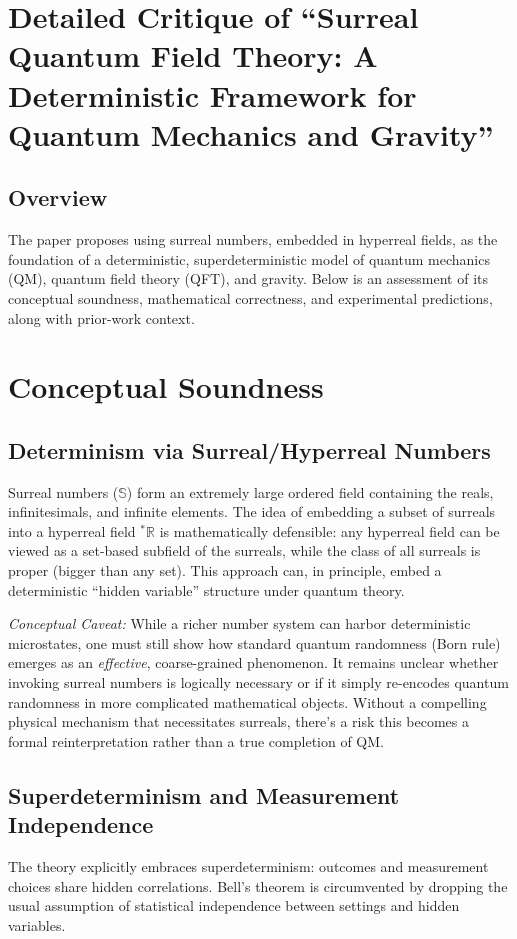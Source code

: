 \documentclass[11pt]{article}
\begin{document}
\section*{Detailed Critique of ``Surreal Quantum Field Theory: A Deterministic Framework for Quantum Mechanics and Gravity''}

\subsection*{Overview}
The paper proposes using surreal numbers, embedded in hyperreal fields, as the foundation of a deterministic, superdeterministic model of quantum mechanics (QM), quantum field theory (QFT), and gravity. Below is an assessment of its conceptual soundness, mathematical correctness, and experimental predictions, along with prior-work context.

\section{Conceptual Soundness}

\subsection{Determinism via Surreal/Hyperreal Numbers}
Surreal numbers ($\mathbb{S}$) form an extremely large ordered field containing the reals, infinitesimals, and infinite elements. The idea of embedding a subset of surreals into a hyperreal field ${}^*\mathbb{R}$ is mathematically defensible: any hyperreal field can be viewed as a set-based subfield of the surreals, while the class of all surreals is proper (bigger than any set). This approach can, in principle, embed a deterministic ``hidden variable'' structure under quantum theory. 

\emph{Conceptual Caveat:} While a richer number system can harbor deterministic microstates, one must still show how standard quantum randomness (Born rule) emerges as an \emph{effective}, coarse-grained phenomenon. It remains unclear whether invoking surreal numbers is logically necessary or if it simply re-encodes quantum randomness in more complicated mathematical objects. Without a compelling physical mechanism that necessitates surreals, there's a risk this becomes a formal reinterpretation rather than a true completion of QM.

\subsection{Superdeterminism and Measurement Independence}
The theory explicitly embraces superdeterminism: outcomes and measurement choices share hidden correlations. Bell's theorem is circumvented by dropping the usual assumption of statistical independence between settings and hidden variables.
\end{document}
